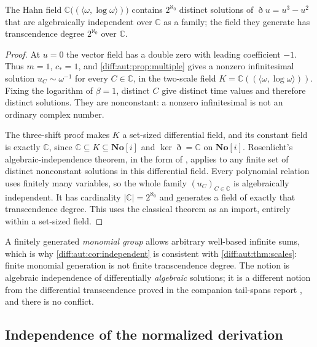 \documentclass[11pt,letterpaper]{article}
\numberwithin{equation}{section}
\theoremstyle{definition}
\theoremstyle{remark}
\newcommand{\SC}{\mathbf{No}[i]}
\newcommand{\C}{\mathbb C}
\newcommand{\Ker}{\operatorname{ker}}
\newcommand{\Dn}{\eth}
\begin{document}
\begin{corollary}
\label{diff:aut:cor:independent}
The Hahn field $\C\bigl((\langle\omega,\log\omega\rangle)\bigr)$ contains $2^{\aleph_{0}}$
distinct solutions of $\Dn u=u^{3}-u^{2}$ that are algebraically independent
over $\C$ as a family; the field they generate has transcendence degree
$2^{\aleph_{0}}$ over $\C$.
\end{corollary}
\begin{proof}
At $u=0$ the vector field has a double zero with leading coefficient
$-1$. Thus $m=1$, $c_*=1$, and \cref{diff:aut:prop:multiple} gives
a nonzero infinitesimal solution $u_C\sim\omega^{-1}$ for every
$C\in\C$, in the two-scale field
$K=\C((\langle\omega,\log\omega\rangle))$.
Fixing the logarithm of $\beta=1$, distinct $C$ give distinct time
values and therefore distinct solutions. They are nonconstant:
a nonzero infinitesimal is not an ordinary complex number.

The three-shift proof makes $K$ a set-sized differential field, and
its constant field is exactly $\C$, since
$\C\subseteq K\subseteq\SC$ and $\Ker\Dn=\C$ on $\SC$.
Rosenlicht's algebraic-independence theorem, in the form of
\cite[Lemma~7.2 and Proposition~7.3, arXiv v1]{NPT}, applies to
any finite set of distinct nonconstant solutions in this differential
field. Every polynomial relation uses finitely many variables, so the
whole family $(u_C)_{C\in\C}$ is algebraically independent.
It has cardinality $|\C|=2^{\aleph_0}$ and generates a field of
exactly that transcendence degree. This uses the classical theorem
as an import, entirely within a set-sized field.
\end{proof}

A finitely generated \emph{monomial group} allows arbitrary well-based infinite
sums, which is why \cref{diff:aut:cor:independent} is consistent with
\cref{diff:aut:thm:scales}: finite monomial generation is not finite
transcendence degree. The notion is algebraic independence of differentially
\emph{algebraic} solutions; it is a different notion from the differential
transcendence proved in the companion tail-spans report \cite{RepoTailSpans},
and there is no conflict.

\subsection{Independence of the normalized derivation}
\label{diff:aut:sub:independence}
\end{document}
